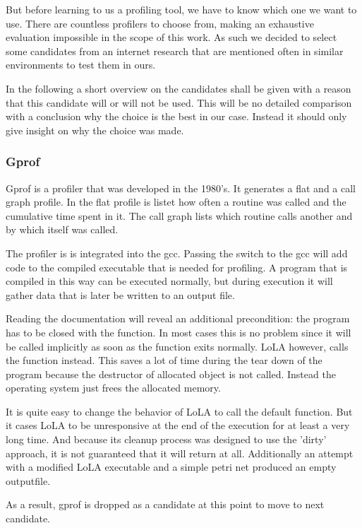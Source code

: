 But before learning to us a profiling tool, we have to know which one we want to use. There are countless profilers to choose from, making an exhaustive evaluation impossible in the scope of this work. As such we decided to select some candidates from an internet research that are mentioned often in similar environments to test them in ours.

In the following a short overview on the candidates shall be given with a reason that this candidate will or will not be used. This will be no detailed comparison with a conclusion why the choice is the best in our case. Instead it should only give insight on why the choice was made.

\subsubsection{Gprof}
Gprof is a profiler that was developed in the 1980's. It generates a flat and a call graph profile\cite{graham1982gprof}. In the flat profile is listet how often a routine was called and the cumulative time spent in it. The call graph lists which routine calls another and by which itself was called.

The profiler is is integrated into the gcc. Passing the  switch to the gcc will add code to the compiled executable that is needed for profiling. A program that is compiled in this way can be executed normally, but during execution it will gather data that is later be written to an output file.

Reading the documentation will reveal an additional precondition: the program has to be closed with the  function. In most cases this is no problem since it will be called implicitly as soon as the  function exits normally. LoLA however, calls the  function instead. This saves a lot of time during the tear down of the program because the destructor of allocated object is not called. Instead the operating system just frees the allocated memory.

It is quite easy to change the behavior of LoLA to call the default  function. But it cases LoLA to be unresponsive at the end of the execution for at least a very long time. And because its cleanup process was designed to use the 'dirty' approach, it is not guaranteed that it will return at all. Additionally an attempt with a modified LoLA executable and a simple petri net produced an empty outputfile.

As a result, gprof is dropped as a candidate at this point to move to next candidate.

